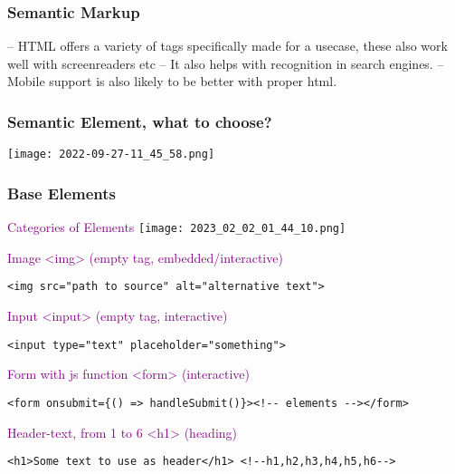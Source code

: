 \documentclass[main.tex,fontsize=6pt,paper=a4,paper=landscape,DIV=calc,]{scrartcl}
\begin{document}
\begin{multicols*}{4}
\subsubsection{Semantic Markup}
-- HTML offers a variety of tags specifically made for a usecase, these also work well with screenreaders etc\newline
-- It also helps with recognition in search engines.\newline
-- Mobile support is also likely to be better with proper html.

\subsubsection{Semantic Element, what to choose?}
\texttt{[image: 2022-09-27-11\_45\_58.png]}

\subsubsection{Base Elements}
\textcolor{purple}{Categories of Elements}
\texttt{[image: 2023\_02\_02\_01\_44\_10.png]}

\textcolor{purple}{Image <img> (empty tag, embedded/interactive)}
\vspace{-2mm}
\begin{lstlisting}
<img src="path to source" alt="alternative text">
\end{lstlisting}
\vspace{2mm}

\textcolor{purple}{Input <input> (empty tag, interactive)}
\vspace{-2mm}
\begin{lstlisting}
<input type="text" placeholder="something">
\end{lstlisting}
\vspace{2mm}

\textcolor{purple}{Form with js function <form> (interactive)}
\vspace{-2mm}
\begin{lstlisting}
<form onsubmit={() => handleSubmit()}><!-- elements --></form>
\end{lstlisting}
\vspace{2mm}

\textcolor{purple}{Header-text, from 1 to 6 <h1> (heading)}
\vspace{-2mm}
\begin{lstlisting}
<h1>Some text to use as header</h1> <!--h1,h2,h3,h4,h5,h6-->
\end{lstlisting}
\vspace{2mm}


\end{multicols*}
\end{document}
